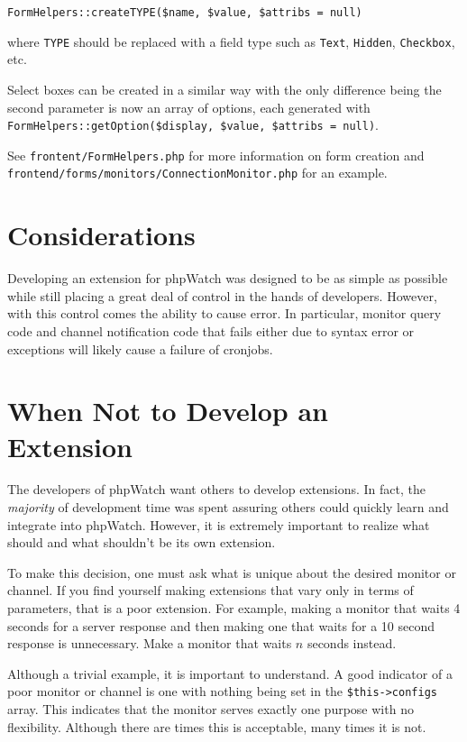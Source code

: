 \documentclass[10pt]{article}
\begin{document}
\begin{center}
    \texttt{FormHelpers::createTYPE(\$name, \$value, \$attribs = null)}
\end{center}

where \texttt{TYPE} should be replaced with a field type such as \texttt{Text}, \texttt{Hidden}, \texttt{Checkbox}, etc.

Select boxes can be created in a similar way with the only difference being the second parameter is now an array of
options, each generated with \texttt{FormHelpers::getOption(\$display, \$value, \$attribs = null)}.

See \texttt{frontent/FormHelpers.php} for more information on form creation and \\
\texttt{frontend/forms/monitors/ConnectionMonitor.php} for an example.

\section{Considerations}
Developing an extension for phpWatch was designed to be as simple as possible while still placing a great deal of
control in the hands of developers.  However, with this control comes the ability to cause error.  In particular,
monitor query code and channel notification code that fails either due to syntax error or exceptions will likely cause a
failure of cronjobs.

\section{When Not to Develop an Extension}
The developers of phpWatch want others to develop extensions.  In fact, the \emph{majority} of development time was
spent assuring others could quickly learn and integrate into phpWatch.  However, it is extremely important to realize
what should and what shouldn't be its own extension.

To make this decision, one must ask what is unique about the desired monitor or channel.  If you find yourself making
extensions that vary only in terms of parameters, that is a poor extension.  For example, making a monitor that waits 4
seconds for a server response and then making one that waits for a 10 second response is unnecessary.  Make a monitor
that waits $n$ seconds instead.

Although a trivial example, it is important to understand.  A good indicator of a poor monitor or channel is one with
nothing being set in the \texttt{\$this->configs} array.  This indicates that the monitor serves exactly one purpose
with no flexibility.  Although there are times this is acceptable, many times it is not.
\end{document}
